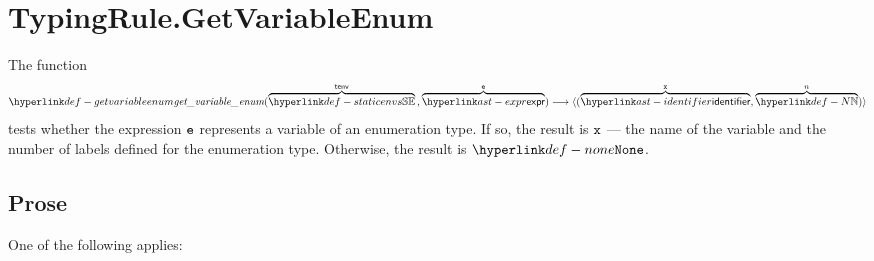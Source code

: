 \section{TypingRule.GetVariableEnum \label{sec:TypingRule.GetVariableEnum}}
\hypertarget{def-getvariableenum}{}
The function
\[
\getvariableenum(\overname{\staticenvs}{\tenv} \aslsep \overname{\expr}{\ve}) \aslto
\langle (\overname{\identifier}{\vx}, \overname{\N}{n})\rangle
\]
tests whether the expression $\texttt{e}$ represents a variable of an enumeration type.
If so, the result is $\texttt{x}$ --- the name of the variable and the number of labels defined for the enumeration type.
Otherwise, the result is $\None$.

\subsection{Prose}
One of the following applies:
